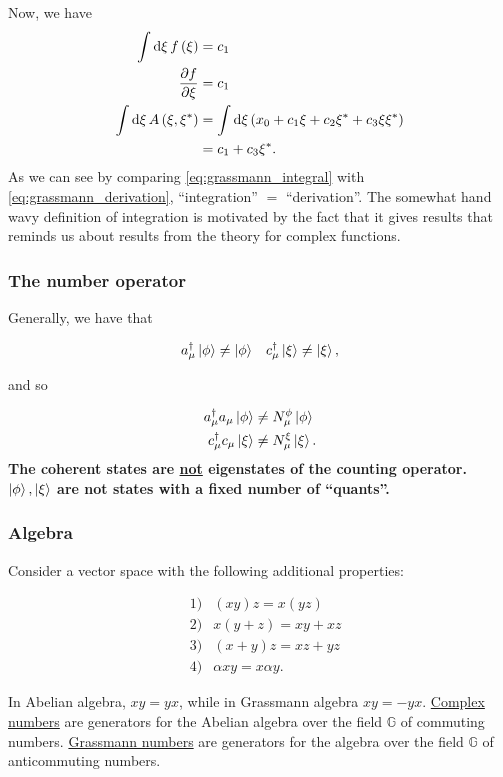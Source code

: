 Now, we have 
\begin{align}
\int\dd{\xi} f\left(\xi\right) &= c_1 \\
\pdv{f}{\xi} &= c_1 \\
\int\dd{\xi} A\left(\xi, \xi^*\right) &= \int\dd{\xi} \left(x_0+c_1\xi+c_2\xi^*+c_3\xi\xi^*\right)\nonumber \\
&=c_1 + c_3\xi^*. \label{eq:grassmann_integral}
\end{align}
As we can see by comparing \eqref{eq:grassmann_integral} with \eqref{eq:grassmann_derivation}, ``integration'' $=$ ``derivation''. The somewhat hand wavy definition of integration is motivated by the fact that it gives results that reminds us about results from the theory for complex functions. 

\subsubsection*{The number operator}
Generally, we have that 

\begin{align}
&a_\mu^\dagger\ket{\phi} \ne \ket{\phi} & c_\mu^\dagger\ket{\xi} \ne \ket{\xi}, 
\end{align}

and so

\begin{align}
a_\mu^\dagger a_\mu\ket{\phi} &\ne N_\mu^\phi\ket{\phi} \\ 
c_\mu^\dagger c_\mu\ket{\xi} &\ne N_\mu^\xi\ket{\xi}.
\end{align}
\textbf{The coherent states are \underline{not} eigenstates of the counting operator. $\ket{\phi}, \ket{\xi}$ are not states with a fixed number of ``quants''.}

\subsubsection*{Algebra}

Consider a vector space with the following additional properties:

\begin{align*}
&1) & (xy)z =x(yz) \\
&2) & x(y+z) = xy+xz \\
&3)  & (x+y)z =xz+yz \\
&4) & \alpha xy = x\alpha y.
\end{align*}

In Abelian algebra, $xy = yx$, while in Grassmann algebra $xy = -yx$. \underline{Complex numbers} are generators for the Abelian algebra over the field $\mathbb{G}$ of commuting numbers. \underline{Grassmann numbers} are generators for the algebra over the field $\mathbb{G}$ of anticommuting numbers. 

